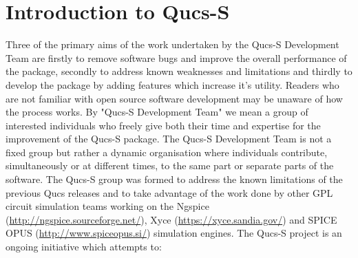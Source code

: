 \documentclass[10pt, a4paper]{report}
\begin{document}
\section{Introduction to Qucs-S}
Three of the primary aims of the work undertaken by the Qucs-S Development Team are firstly to remove software bugs and improve the overall performance of the package, secondly to address known weaknesses and limitations and thirdly to develop the package by adding features which increase it's utility.  Readers who are not familiar with open source software development may be unaware of how the process works.  By "Qucs-S Development Team" we mean a group of interested individuals who freely give both their time and expertise for the improvement of the Qucs-S package.  The Qucs-S Development Team is not a fixed group but rather a dynamic organisation where individuals contribute, simultaneously or at different times, to the same part or separate parts of the software.  The Qucs-S group was formed to address the known limitations of the previous Qucs releases and to take advantage of the work done by other GPL circuit simulation teams working on the Ngspice (\url{http://ngspice.sourceforge.net/}), Xyce (\url{https://xyce.sandia.gov/}) and SPICE OPUS (\url{http://www.spiceopus.si/}) simulation engines. The Qucs-S project is an ongoing initiative which attempts to:
\end{document}
